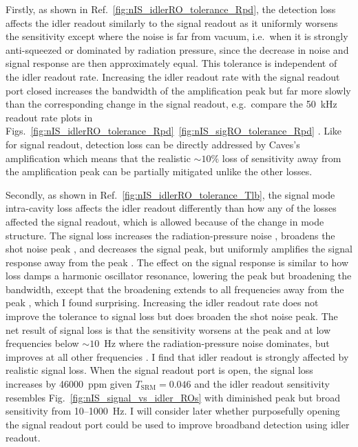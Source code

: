 Firstly, as shown in Ref.~\ref{fig:nIS_idlerRO_tolerance_Rpd}, the detection loss affects the idler readout similarly to the signal readout as it uniformly worsens the sensitivity except where the noise is far from vacuum, i.e.\ when it is strongly anti-squeezed or dominated by radiation pressure, since the decrease in noise and signal response are then approximately equal. This tolerance is independent of the idler readout rate. Increasing the idler readout rate with the signal readout port closed increases the bandwidth of the amplification peak but far more slowly than the corresponding change in the signal readout, e.g.\ compare the 50~kHz readout rate plots in Figs.~\ref{fig:nIS_idlerRO_tolerance_Rpd}~\ref{fig:nIS_sigRO_tolerance_Rpd} . Like for signal readout, detection loss can be directly addressed by Caves's amplification which means that the realistic $\sim10\%$ loss of sensitivity away from the amplification peak  can be partially mitigated  unlike the other losses.

Secondly, as shown in Ref.~\ref{fig:nIS_idlerRO_tolerance_Tlb}, the signal mode intra-cavity loss affects the idler readout differently than how any of the losses affected the signal readout, which is allowed because of the change in mode structure. The signal loss increases the radiation-pressure noise , broadens the shot noise peak , and decreases the signal peak, but uniformly amplifies the signal response away from the peak . The effect on the signal response is similar to how loss damps a harmonic oscillator resonance, lowering the peak but broadening the bandwidth, except that the broadening extends to all frequencies away from the peak , which I found surprising. Increasing the idler readout rate does not improve the tolerance to signal loss but does broaden the shot noise peak. The net result of signal loss is that the sensitivity worsens at the peak and at low frequencies below $\sim10$~Hz where the radiation-pressure noise dominates, but improves at all other frequencies . I find that idler readout is strongly affected by realistic signal loss. When the signal readout port is open, the signal loss increases by 46000~ppm given $T_\text{SRM}=0.046$ and the idler readout sensitivity resembles Fig.~\ref{fig:nIS_signal_vs_idler_ROs} with diminished peak but broad sensitivity from 10--1000~Hz. I will consider later whether purposefully opening the signal readout port could be used to improve broadband detection using idler readout. %

